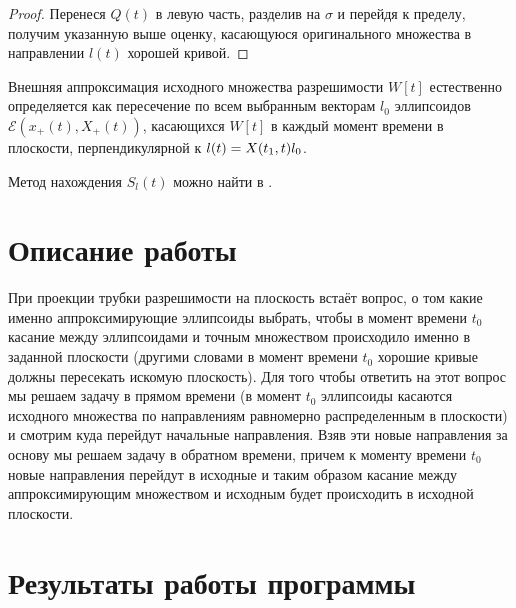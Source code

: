 \documentclass[12pt]{article}
\theoremstyle{rusdef}
\newcommand*{\hm}[1]{#1\nobreak\discretionary{}{\hbox{$\mathsurround=0pt #1$}}{}}
\newcommand{\E}{\ensuremath{\mathcal{E}}} %
\begin{document}
\begin{proof}
Перенеся $Q(t)$ в левую часть, разделив на $\sigma$ и перейдя к пределу, получим указанную выше оценку, касающуюся оригинального множества в направлении $l(t)$ хорошей кривой.

\end{proof}

Внешняя аппроксимация исходного множества разрешимости $W[t]$ естественно определяется как пересечение по всем выбранным векторам $l_0$ эллипсоидов $\E(x_+(t), X_+(t))$, касающихся $W[t]$ в каждый момент времени в плоскости, перпендикулярной к $l(t) \hm= X(t_1,t)l_0$.

Метод нахождения $S_l(t)$ можно найти в \cite{Daryin}.

\section{Описание работы}
При проекции трубки разрешимости на плоскость встаёт вопрос, о том какие именно аппроксимирующие эллипсоиды выбрать, чтобы в момент времени $t_0$ касание между эллипсоидами и точным множеством происходило именно в заданной плоскости (другими словами в момент времени $t_0$ хорошие кривые должны пересекать искомую плоскость). Для того чтобы ответить на этот вопрос мы решаем задачу в прямом времени (в момент $t_0$ эллипсоиды касаются исходного множества по направлениям равномерно распределенным в плоскости) и смотрим куда перейдут начальные направления. Взяв эти новые направления за основу мы решаем задачу в обратном времени, причем к моменту времени $t_0$ новые направления перейдут в исходные и таким образом касание между аппроксимирующим множеством и исходным будет происходить в исходной плоскости.
\section{Результаты работы программы}
\end{document}
